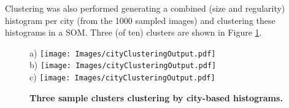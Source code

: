 \documentclass[final,3p,times,authoryear]{elsarticle}
\begin{document}
%




%

Clustering was also performed generating a combined (size and regularity) histogram per city (from the 1000 sampled images) and clustering these histograms in a SOM. Three (of ten) clusters are shown in Figure \ref{fig:cityclustering}.


\begin{figure}[!htbp]
    \centering    
a) \texttt{[image: Images/cityClusteringOutput.pdf]}  \\
 b) \texttt{[image: Images/cityClusteringOutput.pdf]}  \\
 c)  \texttt{[image: Images/cityClusteringOutput.pdf]}  
\caption{\bf Three sample clusters clustering by city-based histograms. }    
 \label{fig:cityclustering}  
\end{figure} 
\end{document}
